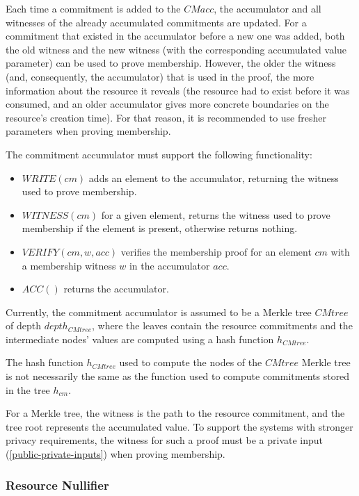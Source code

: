 Each time a commitment is added to the $CMacc$, the accumulator and all witnesses of the already accumulated commitments are updated.
For a commitment that existed in the accumulator before a new one was added, both the old witness and the new witness (with the corresponding accumulated value parameter) can be used to prove membership. However, the older the witness (and, consequently, the accumulator) that is used in the proof, the more information about the resource it reveals (the resource had to exist before it was consumed, and an older accumulator gives more concrete boundaries on the resource's creation time). For that reason, it is recommended to use fresher parameters when proving membership.

The commitment accumulator must support the following functionality:
\begin{itemize}
    \item $WRITE(cm)$ adds an element to the accumulator, returning the witness used to prove membership. 
    \item $WITNESS(cm)$ for a given element, returns the witness used to prove membership if the element is present, otherwise returns nothing.
    \item $VERIFY(cm, w, acc)$ verifies the membership proof for an element $cm$ with a membership witness $w$ in the accumulator $acc$.
    \item $ACC()$ returns the accumulator.
\end{itemize}

Currently, the commitment accumulator is assumed to be a Merkle tree $CMtree$ of depth $depth_{CMtree}$, where the leaves contain the resource commitments and the intermediate nodes' values are computed using a hash function $h_{CMtree}$. 

\begin{remark}
    The hash function $h_{CMtree}$ used to compute the nodes of the $CMtree$ Merkle tree is not necessarily the same as the function used to compute commitments stored in the tree $h_{cm}$.
\end{remark}

For a Merkle tree, the witness is the path to the resource commitment, and the tree root represents the accumulated value. To support the systems with stronger privacy requirements, the witness for such a proof must be a private input (\ref{public-private-inputs}) when proving membership.

\subsubsection{Resource Nullifier}\label{nf}

